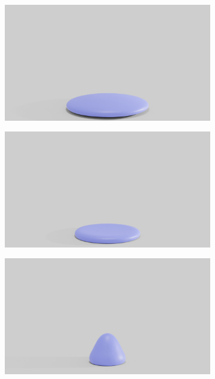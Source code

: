 \begin{figure}
	\begin{subfigure}{.16\linewidth}
		\centering
		{\includegraphics[width=2.0\textwidth]{images/soft_ball/045/0300.jpg}}
		\label{sfig:ball-045-3}
	\end{subfigure}%
	\begin{subfigure}{.16\linewidth}
		\centering
		{\includegraphics[width=2.0\textwidth]{images/soft_ball/045/0350.jpg}}
		\label{sfig:ball-045-4}
	\end{subfigure}%
	\begin{subfigure}{.16\linewidth}
		\centering
		{\includegraphics[width=2.0\textwidth]{images/soft_ball/045/0400.jpg}}

\end{subfigure}
\end{figure}
